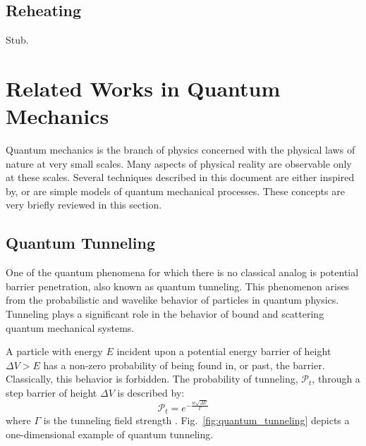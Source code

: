 \documentclass[11pt]{afthesis}
\begin{document}
	\subsection{Reheating}
	Stub.
	
	
	\section{Related Works in Quantum Mechanics}
	
	
	Quantum mechanics is the branch of physics concerned with the physical laws of nature at very small scales. Many aspects of physical reality are observable only at these scales. Several techniques described in this document are either inspired by, or are simple models of quantum mechanical processes. These concepts are very briefly reviewed in this section. 
	
	\subsection{Quantum Tunneling} 
	
	
	One of the quantum phenomena for which there is no classical analog is potential barrier penetration, also known as quantum tunneling. This phenomenon arises from the probabilistic and wavelike behavior of particles in quantum physics. Tunneling plays a significant role in the behavior of bound and scattering quantum mechanical systems.
	
	A particle with energy \begin{math} E \end{math} incident upon a potential energy barrier of height \begin{math} \Delta V > E  \end{math} has a non-zero probability of being found in, or past, the barrier. Classically, this behavior is forbidden. The probability of tunneling, \begin{math} \mathcal{P}_t \end{math}, through a step barrier of height \begin{math} \Delta V  \end{math} is described by: 
	\begin{equation}
	\mathcal{P}_t = e^{-\frac{w \sqrt{\Delta V}}{ \Gamma}} 
	\end{equation} where \begin{math} \Gamma \end{math} is the tunneling field strength \cite{mukherjee2015multivariatesearchqa}. Fig.~\ref{fig:quantum_tunneling} depicts a one-dimensional example of quantum tunneling.
	
\end{document}
